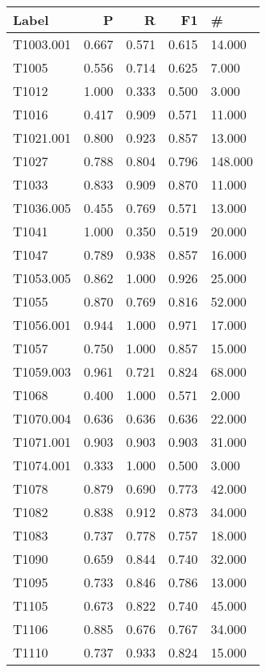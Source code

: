 \begin{tabular}{lrrrl}
    \toprule
    Label     & P     & R     & F1    & \#      \\
    \midrule
    T1003.001 & 0.667 & 0.571 & 0.615 & 14.000  \\
    T1005     & 0.556 & 0.714 & 0.625 & 7.000   \\
    T1012     & 1.000 & 0.333 & 0.500 & 3.000   \\
    T1016     & 0.417 & 0.909 & 0.571 & 11.000  \\
    T1021.001 & 0.800 & 0.923 & 0.857 & 13.000  \\
    T1027     & 0.788 & 0.804 & 0.796 & 148.000 \\
    T1033     & 0.833 & 0.909 & 0.870 & 11.000  \\
    T1036.005 & 0.455 & 0.769 & 0.571 & 13.000  \\
    T1041     & 1.000 & 0.350 & 0.519 & 20.000  \\
    T1047     & 0.789 & 0.938 & 0.857 & 16.000  \\
    T1053.005 & 0.862 & 1.000 & 0.926 & 25.000  \\
    T1055     & 0.870 & 0.769 & 0.816 & 52.000  \\
    T1056.001 & 0.944 & 1.000 & 0.971 & 17.000  \\
    T1057     & 0.750 & 1.000 & 0.857 & 15.000  \\
    T1059.003 & 0.961 & 0.721 & 0.824 & 68.000  \\
    T1068     & 0.400 & 1.000 & 0.571 & 2.000   \\
    T1070.004 & 0.636 & 0.636 & 0.636 & 22.000  \\
    T1071.001 & 0.903 & 0.903 & 0.903 & 31.000  \\
    T1074.001 & 0.333 & 1.000 & 0.500 & 3.000   \\
    T1078     & 0.879 & 0.690 & 0.773 & 42.000  \\
    T1082     & 0.838 & 0.912 & 0.873 & 34.000  \\
    T1083     & 0.737 & 0.778 & 0.757 & 18.000  \\
    T1090     & 0.659 & 0.844 & 0.740 & 32.000  \\
    T1095     & 0.733 & 0.846 & 0.786 & 13.000  \\
    T1105     & 0.673 & 0.822 & 0.740 & 45.000  \\
    T1106     & 0.885 & 0.676 & 0.767 & 34.000  \\
    T1110     & 0.737 & 0.933 & 0.824 & 15.000  \\

\end{tabular}

